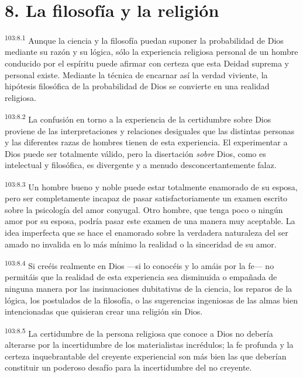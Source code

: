 \section*{8. La filosofía y la religión}
\par
\textsuperscript{103:8.1} Aunque la ciencia y la filosofía puedan suponer la probabilidad de Dios mediante su razón y su lógica, sólo la experiencia religiosa personal de un hombre conducido por el espíritu puede afirmar con certeza que esta Deidad suprema y personal existe. Mediante la técnica de encarnar así la verdad viviente, la hipótesis filosófica de la probabilidad de Dios se convierte en una realidad religiosa.

\par
\textsuperscript{103:8.2} La confusión en torno a la experiencia de la certidumbre sobre Dios proviene de las interpretaciones y relaciones desiguales que las distintas personas y las diferentes razas de hombres tienen de esta experiencia. El experimentar a Dios puede ser totalmente válido, pero la disertación \textit{sobre} Dios, como es intelectual y filosófica, es divergente y a menudo desconcertantemente falaz.

\par
\textsuperscript{103:8.3} Un hombre bueno y noble puede estar totalmente enamorado de su esposa, pero ser completamente incapaz de pasar satisfactoriamente un examen escrito sobre la psicología del amor conyugal. Otro hombre, que tenga poco o ningún amor por su esposa, podría pasar este examen de una manera muy aceptable. La idea imperfecta que se hace el enamorado sobre la verdadera naturaleza del ser amado no invalida en lo más mínimo la realidad o la sinceridad de su amor.

\par
\textsuperscript{103:8.4} Si creéis realmente en Dios ---si lo conocéis y lo amáis por la fe--- no permitáis que la realidad de esta experiencia sea disminuida o empañada de ninguna manera por las insinuaciones dubitativas de la ciencia, los reparos de la lógica, los postulados de la filosofía, o las sugerencias ingeniosas de las almas bien intencionadas que quisieran crear una religión sin Dios.

\par
\textsuperscript{103:8.5} La certidumbre de la persona religiosa que conoce a Dios no debería alterarse por la incertidumbre de los materialistas incrédulos; la fe profunda y la certeza inquebrantable del creyente experiencial son más bien las que deberían constituir un poderoso desafío para la incertidumbre del no creyente.

